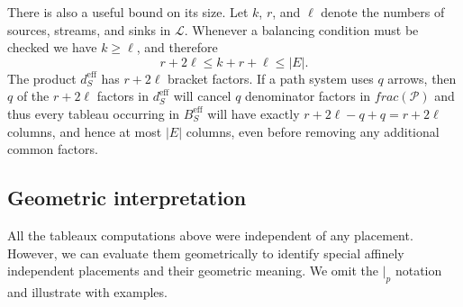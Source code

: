 \documentclass[11pt,letterpaper]{amsart}
\theoremstyle{definition}
\begin{document}
There is also a useful bound on its size.  Let $k$, $r$, and $\ell$ denote the numbers of sources, streams, and sinks in $\mathcal{L}$.  Whenever a balancing condition must be checked we have $k \geq \ell$, and therefore
\begin{equation*}
    r+2\ell
    \leq k+r+\ell
    \leq |E|.
\end{equation*}
The product $d_S^{\text{eff}}$ has $r+2\ell$ bracket factors. If a path system uses $q$ arrows, then $q$ of the $r+2\ell$ factors in $d_S^{\text{eff}}$ will cancel $q$ denominator factors in $frac(\mathcal{P})$ and thus every tableau occurring in $B_S^{\text{eff}}$ will have exactly $r+2\ell - q + q = r+2\ell$ columns, and hence at most $|E|$ columns, even before removing any additional common factors. 










\subsection{Geometric interpretation} All the tableaux computations above were independent of any placement. However, we can evaluate them geometrically to identify special affinely independent placements and their geometric meaning. We omit the $|_p$ notation and illustrate with examples.
\end{document}
